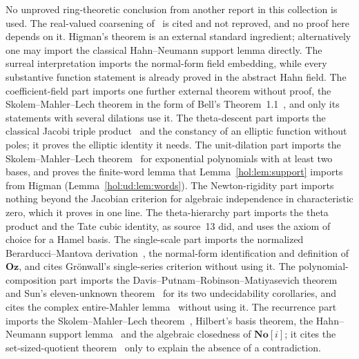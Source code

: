 \documentclass[11pt]{article}
\numberwithin{equation}{section}
\theoremstyle{definition}
\theoremstyle{remark}
\newcommand{\No}{\mathbf{No}}
\newcommand{\Oz}{\mathbf{Oz}}
\begin{document}
No unproved ring-theoretic conclusion from another report in this collection
is used. The real-valued coarsening of~\cite[Lemma~9.1]{repoentire} is cited
and not reproved, and no proof here depends on it. Higman's theorem is an
external standard ingredient; alternatively one may import the classical
Hahn--Neumann support lemma directly. The surreal interpretation imports the
normal-form field embedding, while every substantive function statement is
already proved in the abstract Hahn field. The coefficient-field part imports
one further external theorem without proof, the Skolem--Mahler--Lech theorem
in the form of Bell's Theorem~1.1~\cite{bell}, and only its statements with
several dilations use it. The theta-descent part imports the classical Jacobi
triple product~\cite{dlmftheta} and the constancy of an elliptic function
without poles; it proves the elliptic identity it needs. The unit-dilation
part imports the Skolem--Mahler--Lech theorem~\cite{lech,belldoc} for
exponential polynomials with at least two bases, and proves the finite-word
lemma that Lemma~\ref{hol:lem:support} imports from Higman
(Lemma~\ref{hol:ud:lem:words}). The Newton-rigidity part imports nothing
beyond the Jacobian criterion for algebraic independence in characteristic
zero, which it proves in one line. The theta-hierarchy part imports the theta
product and the Tate cubic identity, as source~13 did, and uses the axiom of
choice for a Hamel basis. The single-scale part imports the normalized
Berarducci--Mantova derivation~\cite{bm}, the normal-form identification and
definition of $\Oz$, and cites Gr\"onwall's single-series criterion without
using it. The polynomial-composition part imports the
Davis--Putnam--Robinson--Matiyasevich theorem~\cite{matiyasevich} and Sun's
eleven-unknown theorem~\cite{sun} for its two undecidability corollaries, and
cites the complex entire-Mahler lemma~\cite[Lemma~6]{bcr} without using it.
The recurrence part imports the Skolem--Mahler--Lech theorem~\cite{lech,belldoc},
Hilbert's basis theorem, the Hahn--Neumann support lemma~\cite{neumann,bagayoko}
and the algebraic closedness of $\No[i]$; it cites the set-sized-quotient
theorem~\cite{repoosq} only to explain the absence of a contradiction.
\end{document}
